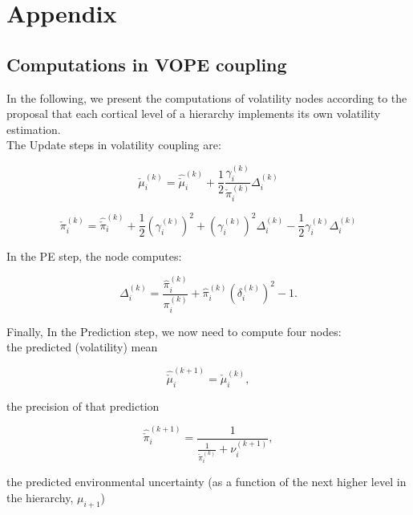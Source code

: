 \section{Appendix}

\subsection{Computations in VOPE coupling}

In the following, we present the computations of volatility nodes according to the proposal that each cortical level of a hierarchy implements its own volatility estimation.\\

The \textsf{Update} steps in volatility coupling are:

\begin{equation}
	\check{\mu}_i^{(k)} = \hat{\check{\mu}}_i^{(k)} + \frac{1}{2} \frac{\gamma_{i}^{(k)}}{\check{\pi}_i^{(k)}} \Delta_{i}^{(k)}
\end{equation}

\begin{equation}
	\check{\pi}_i^{(k)} = \hat{\check{\pi}}_i^{(k)} + \frac{1}{2} (\gamma_{i}^{(k)})^2 + (\gamma_{i}^{(k)})^2 \Delta_{i}^{(k)} - \frac{1}{2} \gamma_{i}^{(k)} \Delta_{i}^{(k)}
\end{equation}

In the \textsf{PE} step, the node computes:

\begin{equation}
  \Delta_i^{(k)} = \frac{\hat{\pi}_i^{(k)}}{\pi_{i}^{(k)}} + \hat{\pi}_i^{(k)} (\delta_i^{(k)})^2 - 1. 
\end{equation}

Finally, In the \textsf{Prediction} step, we now need to compute four nodes: \\
the predicted (volatility) mean

\begin{equation}
	\hat{\check{\mu}}_i^{(k+1)} = \check{\mu}_i^{(k)},
\end{equation}

the precision of that prediction

\begin{equation}
  \hat{\check{\pi}}_i^{(k+1)} = \frac{1}{\frac{1}{\check{\pi}_i^{(k)}} + \nu_i^{(k+1)}}, 
\end{equation}

the predicted environmental uncertainty (as a function of the next higher level in the hierarchy, $\mu_{i+1}$)

